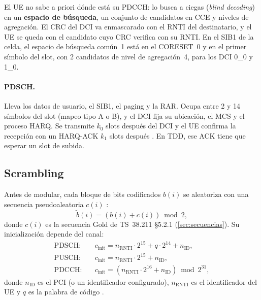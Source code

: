 El UE no sabe a priori dónde está su PDCCH: lo busca a ciegas (\emph{blind decoding}) en un \textbf{espacio de búsqueda}, un conjunto de candidatos en CCE y niveles de agregación. El CRC del DCI va enmascarado con el RNTI del destinatario, y el UE se queda con el candidato cuyo CRC verifica con su RNTI. En el SIB1 de la celda, el espacio de búsqueda común~1 está en el CORESET~0 y en el primer símbolo del slot, con 2 candidatos de nivel de agregación~4, para los DCI 0\_0 y 1\_0.

\paragraph{PDSCH.} Lleva los datos de usuario, el SIB1, el paging y la RAR. Ocupa entre 2 y 14 símbolos del slot (mapeo tipo A o B), y el DCI fija su ubicación, el MCS y el proceso HARQ. Se transmite $k_0$ slots después del DCI y el UE confirma la recepción con un HARQ-ACK $k_1$ slots después \cite{ts38214}. En TDD, ese ACK tiene que esperar un slot de subida.

\subsection{Scrambling}\label{sec:scrambling}
Antes de modular, cada bloque de bits codificados $b(i)$ se aleatoriza con una secuencia pseudoaleatoria $c(i)$ \cite[§7.3.1.1]{ts38211}:
\begin{equation}
\tilde{b}(i) = \left(b(i) + c(i)\right)\bmod 2,
\label{eq:scr}
\end{equation}
donde $c(i)$ es la secuencia Gold de TS~38.211 §5.2.1 (\cref{sec:secuencias}). Su inicialización depende del canal:
\begin{align}
\text{PDSCH:}&\quad c_\text{init} = n_\text{RNTI}\cdot 2^{15} + q\cdot 2^{14} + n_\text{ID}, \label{eq:cinit_pdsch}\\
\text{PUSCH:}&\quad c_\text{init} = n_\text{RNTI}\cdot 2^{15} + n_\text{ID}, \label{eq:cinit_pusch}\\
\text{PDCCH:}&\quad c_\text{init} = \left(n_\text{RNTI}\cdot 2^{16} + n_\text{ID}\right)\bmod 2^{31},
\end{align}
donde $n_\text{ID}$ es el PCI (o un identificador configurado), $n_\text{RNTI}$ es el identificador del UE y $q$ es la palabra de código \cite[§6.3.1.1, §7.3.1.1, §7.3.2.3]{ts38211}.

